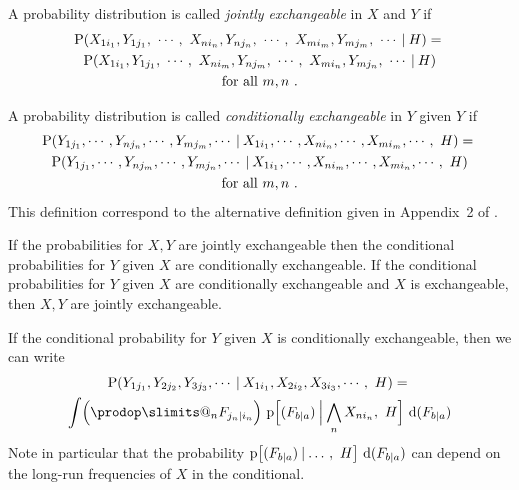 \documentclass[\ifafour a4paper,12pt,\else a5paper,10pt,\fi%
onecolumn,oneside,article,%
british%
]{memoir}
\makeatletter
\theoremstyle{remark}
\theoremstyle{innote}
\def\prod{\DOTSI\prodop\slimits@}
\newcommand*{\di}{\mathrm{d}}%
\newcommand*{\p}{\mathrm{p}}%
\renewcommand*{\P}{\mathrm{P}}%
\renewcommand*{\|}[1][]{\nonscript\:#1\vert\nonscript\:\mathopen{}}
\renewcommand*{\=}{\TextOrMath\texteq\eq}
\makeatother
\begin{document}
A probability distribution is called \emph{jointly exchangeable} in $X$ and
$Y$ if
\begin{multline}
  \label{eq:joint_exch}
  \P(
X_{1 i_{1}} , Y_{1 j_{1}}
,\  \dotsb ,\ 
X_{n i_{n}} , Y_{n j_{n}}
,\  \dotsb ,\ 
X_{m i_{m}} , Y_{m j_{m}}
,\  \dotsb
\| H )
={}\\
  \P(
X_{1 i_{1}} , Y_{1 j_{1}}
,\  \dotsb ,\ 
X_{n i_{m}} , Y_{n j_{m}}
,\  \dotsb ,\ 
X_{m i_{n}} , Y_{m j_{n}}
,\  \dotsb
\| H )
\\\text{for all $m,n$} \ .
\end{multline}

A probability distribution is called \emph{conditionally exchangeable} in $Y$ given
$Y$ if
\begin{multline}
  \label{eq:conditional_exch}
  \P(
Y_{1 j_{1}}
,  \dotsb,
Y_{n j_{n}}
,  \dotsb, 
Y_{m j_{m}}
,  \dotsb
\|
X_{1 i_{1}}
,  \dotsb,
X_{n i_{n}}
,  \dotsb, 
X_{m i_{m}}
,  \dotsb,\ 
 H )
={}\\
  \P(
Y_{1 j_{1}}
,  \dotsb,
Y_{n j_{m}}
,  \dotsb, 
Y_{m j_{n}}
,  \dotsb
\|
X_{1 i_{1}}
,  \dotsb,
X_{n i_{m}}
,  \dotsb, 
X_{m i_{n}}
,  \dotsb,\ 
 H )
\\\text{for all $m,n$} \ .
\end{multline}
This definition correspond to the alternative definition given in
Appendix~2 of \textcite{lindleyetal1981}.

If the probabilities for $X,Y$ are jointly exchangeable then the
conditional probabilities for $Y$ given $X$ are conditionally exchangeable.
If the conditional probabilities for $Y$ given $X$ are conditionally
exchangeable and $X$ is exchangeable, then $X,Y$ are jointly exchangeable.

If the conditional probability for $Y$ given $X$ is conditionally
exchangeable, then we can write
\begin{multline}
  \label{eq:repres_conditional}
    \P( Y_{1 j_{1}} ,  Y_{2 j_{2}} ,  Y_{3 j_{3}} ,  \dotsb \|
X_{1 i_{1}} ,  X_{2 i_{2}} ,  X_{3 i_{3}} ,  \dotsb,\ H )
={}\\
\int
\Bigl(\prod_{n} F_{j_{n}\| i_{n}}\Bigr) \
\p\Bigl[(F_{b\|a}) \|[\Big] \bigwedge_{n} X_{n i_{n}},\ H\Bigr] \ \di(F_{b\|a})
\end{multline}
Note in particular that the probability $\p\bigl[(F_{b\|a}) \|
\dotso,\ H\bigr] \ \di(F_{b\|a})$ can depend on the long-run frequencies of
$X$ in the conditional.


\end{document}
